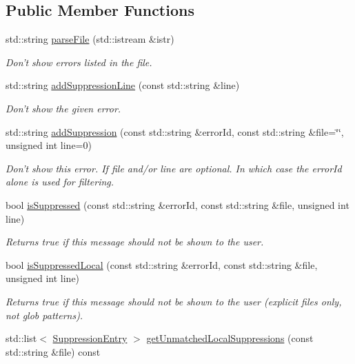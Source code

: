 \subsection*{Public Member Functions}
\begin{DoxyCompactItemize}
\item 
std\-::string \hyperlink{class_suppressions_aee3277fc25f8f187db345edd55e7ac15}{parse\-File} (std\-::istream \&istr)
\begin{DoxyCompactList}\small\item\em Don't show errors listed in the file. \end{DoxyCompactList}\item 
std\-::string \hyperlink{class_suppressions_a551c8827307e49a4ba1c49e9263de88a}{add\-Suppression\-Line} (const std\-::string \&line)
\begin{DoxyCompactList}\small\item\em Don't show the given error. \end{DoxyCompactList}\item 
std\-::string \hyperlink{class_suppressions_a164a7e9132d606fab7db13a32f85a56d}{add\-Suppression} (const std\-::string \&error\-Id, const std\-::string \&file=\char`\"{}\char`\"{}, unsigned int line=0)
\begin{DoxyCompactList}\small\item\em Don't show this error. If file and/or line are optional. In which case the error\-Id alone is used for filtering. \end{DoxyCompactList}\item 
bool \hyperlink{class_suppressions_a864800f37da0ddd1747b85b76d1ac179}{is\-Suppressed} (const std\-::string \&error\-Id, const std\-::string \&file, unsigned int line)
\begin{DoxyCompactList}\small\item\em Returns true if this message should not be shown to the user. \end{DoxyCompactList}\item 
bool \hyperlink{class_suppressions_adb8b4041703c9fd79e4506a1166e0afa}{is\-Suppressed\-Local} (const std\-::string \&error\-Id, const std\-::string \&file, unsigned int line)
\begin{DoxyCompactList}\small\item\em Returns true if this message should not be shown to the user (explicit files only, not glob patterns). \end{DoxyCompactList}\item 
std\-::list$<$ \hyperlink{struct_suppressions_1_1_suppression_entry}{Suppression\-Entry} $>$ \hyperlink{class_suppressions_a1afed88b3119b9d65e0caf70c6e9c23a}{get\-Unmatched\-Local\-Suppressions} (const std\-::string \&file) const 

\end{DoxyCompactItemize}
